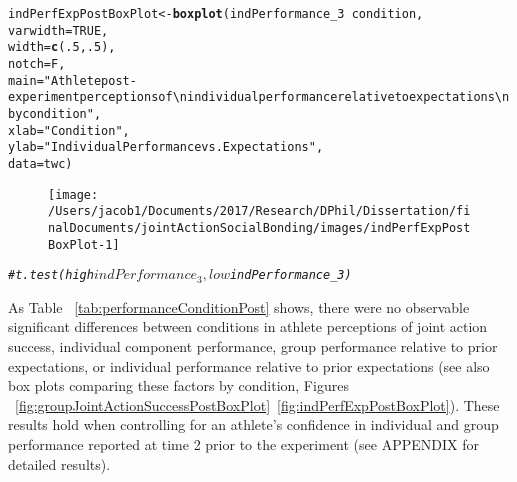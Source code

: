 \documentclass[english]{article}\usepackage[]{graphicx}\usepackage[]{color}
\makeatletter
\def\maxwidth{ %
  \ifdim\Gin@nat@width>\linewidth
    \linewidth
  \else
    \Gin@nat@width
  \fi
}
\newcommand{\hlnum}[1]{\textcolor[rgb]{0.686,0.059,0.569}{#1}}%
\newcommand{\hlstr}[1]{\textcolor[rgb]{0.192,0.494,0.8}{#1}}%
\newcommand{\hlcom}[1]{\textcolor[rgb]{0.678,0.584,0.686}{\textit{#1}}}%
\newcommand{\hlopt}[1]{\textcolor[rgb]{0,0,0}{#1}}%
\newcommand{\hlstd}[1]{\textcolor[rgb]{0.345,0.345,0.345}{#1}}%
\newcommand{\hlkwb}[1]{\textcolor[rgb]{0.69,0.353,0.396}{#1}}%
\newcommand{\hlkwc}[1]{\textcolor[rgb]{0.333,0.667,0.333}{#1}}%
\newcommand{\hlkwd}[1]{\textcolor[rgb]{0.737,0.353,0.396}{\textbf{#1}}}%
\newenvironment{kframe}{%
 \def\at@end@of@kframe{}%
 \ifinner\ifhmode%
  \def\at@end@of@kframe{\end{minipage}}%
  \begin{minipage}{\columnwidth}%
 \fi\fi%
 \def\FrameCommand##1{\hskip\@totalleftmargin \hskip-\fboxsep
 \colorbox{shadecolor}{##1}\hskip-\fboxsep
     \hskip-\linewidth \hskip-\@totalleftmargin \hskip\columnwidth}%
 \MakeFramed {\advance\hsize-\width
   \@totalleftmargin\z@ \linewidth\hsize
   \@setminipage}}%
 {\par\unskip\endMakeFramed%
 \at@end@of@kframe}
\newenvironment{knitrout}{}{} %
\makeatother
\begin{document}
\begin{knitrout}
\color{fgcolor}\begin{kframe}
\begin{alltt}
  \hlstd{indPerfExpPostBoxPlot} \hlkwb{<-} \hlkwd{boxplot}\hlstd{(indPerformance_3} \hlopt{~} \hlstd{condition,}
                                          \hlkwc{varwidth} \hlstd{=} \hlnum{TRUE}\hlstd{,}
                                          \hlkwc{width} \hlstd{=} \hlkwd{c}\hlstd{(}\hlnum{.5}\hlstd{,}\hlnum{.5}\hlstd{),}
                                          \hlkwc{notch} \hlstd{= F,}
                                          \hlkwc{main} \hlstd{=} \hlstr{"Athlete post-experiment perceptions of \textbackslash{}n individual performance relative to expectations \textbackslash{}n by condition"}\hlstd{,}
                                          \hlkwc{xlab} \hlstd{=} \hlstr{"Condition"}\hlstd{,}
                                          \hlkwc{ylab} \hlstd{=} \hlstr{"Individual Performance vs. Expectations"}\hlstd{,}
                                          \hlkwc{data} \hlstd{= twc)}
\end{alltt}
\end{kframe}\begin{figure}

{\centering \texttt{[image: /Users/jacob1/Documents/2017/Research/DPhil/Dissertation/finalDocuments/jointActionSocialBonding/images/indPerfExpPostBoxPlot-1]} 

}

\end{figure}

\begin{kframe}\begin{alltt}
\hlcom{# t.test(high$indPerformance_3, low$indPerformance_3)}
\end{alltt}
\end{kframe}
\end{knitrout}

As Table ~\ref{tab:performanceConditionPost} shows, there were no observable significant differences between conditions in athlete perceptions of joint action success, individual component performance, group performance relative to prior expectations, or individual performance relative to prior expectations (see also box plots comparing these factors by condition, Figures ~\ref{fig:groupJointActionSuccessPostBoxPlot}\nobreakdash~\ref{fig:indPerfExpPostBoxPlot}). These results hold when controlling for an athlete's confidence in individual and group performance reported at time 2 prior to the experiment (see APPENDIX for detailed results).
\end{document}

